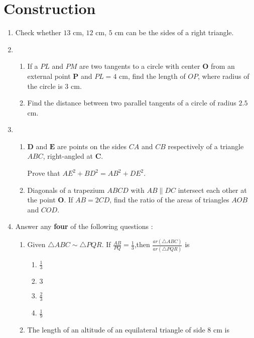 \documentclass{article}
\let\vec\mathbf
\begin{document}
\section*{\centering Construction}
\begin{enumerate}
\item Check whether $13$ cm, $12$ cm, $5$ cm can be the sides of a right triangle.
\item \begin{enumerate}
    \item If a $PL$ and $PM$ are two tangents to a circle with center $\vec{O}$ from an external point $\vec{P}$ and $PL=4$ cm, find the length of $OP$, where radius of the circle is $3$ cm.
    \item Find the distance between two parallel tangents of a circle of radius $2.5$ cm.
\end{enumerate}
    \item 
    \begin{enumerate}
    \item $\vec{D}$ and $\vec{E}$ are points on the sides $CA$ and $CB$ respectively of  a triangle $ABC$, right-angled at $\vec{C}$.
    
    Prove that $AE^2+BD^2=AB^2+DE^2$.
    
    \item Diagonals of a trapezium $ABCD$ with $AB\parallel DC$ intersect each other at the point $\vec{O}$. If $AB=2CD$, find the ratio of the areas of triangles $AOB$ and $COD$.
    \end{enumerate}

    \item Answer any \textbf{four} of the following questions :
      \begin{enumerate}[label=(\roman*)]
        \item Given $\triangle ABC \sim \triangle PQR$. If $\frac{AB}{PQ}=\frac{1}{3}$,then $\frac{ar(\triangle ABC)}{ar(\triangle PQR)}$ is 
        \begin{enumerate}[label=(\Alph*)]
            \item $\frac{1}{3}$
            \item $3$
            \item $\frac{2}{3}$
            \item $\frac{1}{9}$
        \end{enumerate}
        
        \item The length of an altitude of an equilateral triangle of side $8$ cm is
        

\end{enumerate}
\end{enumerate}
\end{document}
